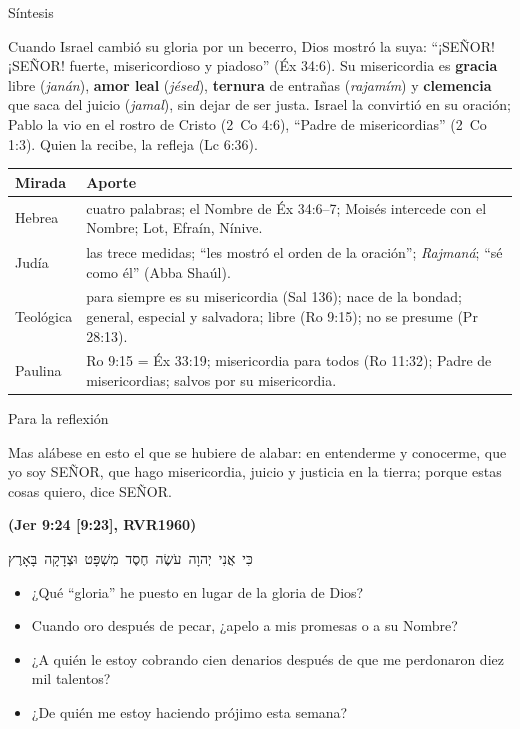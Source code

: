 \documentclass[hyperref={bookmarks=false},aspectratio=169]{beamer}
\newcommand{\heb}[1]{\mbox{\foreignlanguage{hebrew}{#1}}}
\newcommand{\SENOR}{S{\fontsize{0.78em}{1em}\selectfont EÑOR}}
\newcommand{\fuente}[1]{\par\hfill{\upshape\bfseries\footnotesize\textcolor{azul}{#1}}}
\newcommand{\destacar}[1]{\textbf{\textcolor{azul}{#1}}}
\begin{document}
\begin{frame}{Síntesis}
\begin{tcolorbox}[colback=papiro,colframe=azul,boxrule=1pt,arc=3pt]
\small Cuando Israel cambió su gloria por un becerro, Dios mostró la suya: ``¡\SENOR! ¡\SENOR! fuerte, misericordioso y piadoso'' (Éx 34:6). Su misericordia es \destacar{gracia} libre (\emph{janán}), \destacar{amor leal} (\emph{jésed}), \destacar{ternura} de entrañas (\emph{rajamím}) y \destacar{clemencia} que saca del juicio (\emph{jamal}), sin dejar de ser justa. Israel la convirtió en su oración; Pablo la vio en el rostro de Cristo (2~Co 4:6), ``Padre de misericordias'' (2~Co 1:3). Quien la recibe, la refleja (Lc 6:36).
\end{tcolorbox}
\scriptsize\renewcommand{\arraystretch}{1.15}
\begin{tabular}{@{}>{\RaggedRight\arraybackslash}p{2.4cm}>{\RaggedRight\arraybackslash}p{9.4cm}@{}}
\toprule
\textbf{Mirada} & \textbf{Aporte} \\ \midrule
Hebrea & cuatro palabras; el Nombre de Éx 34:6--7; Moisés intercede con el Nombre; Lot, Efraín, Nínive. \\
Judía & las trece medidas; ``les mostró el orden de la oración''; \emph{Rajmaná}; ``sé como él'' (Abba Shaúl). \\
Teológica & para siempre es su misericordia (Sal 136); nace de la bondad; general, especial y salvadora; libre (Ro 9:15); no se presume (Pr 28:13). \\
Paulina & Ro 9:15 = Éx 33:19; misericordia para todos (Ro 11:32); Padre de misericordias; salvos por su misericordia. \\
\bottomrule
\end{tabular}
\end{frame}

\begin{frame}{Para la reflexión}
\begin{cita}Mas alábese en esto el que se hubiere de alabar: en entenderme y conocerme, que yo soy \SENOR, que hago misericordia, juicio y justicia en la tierra; porque estas cosas quiero, dice \SENOR.\fuente{(Jer 9:24 [9:23], RVR1960)}\end{cita}
\begin{center}\heb{כִּי אֲנִי יְהוָה עֹשֶׂה חֶסֶד מִשְׁפָּט וּצְדָקָה בָּאָרֶץ}\end{center}
\small
\begin{itemize}
\item ¿Qué ``gloria'' he puesto en lugar de la gloria de Dios?
\item Cuando oro después de pecar, ¿apelo a mis promesas o a su Nombre?
\item ¿A quién le estoy cobrando cien denarios después de que me perdonaron diez mil talentos?
\item ¿De quién me estoy haciendo prójimo esta semana?
\end{itemize}
\end{frame}
\end{document}
